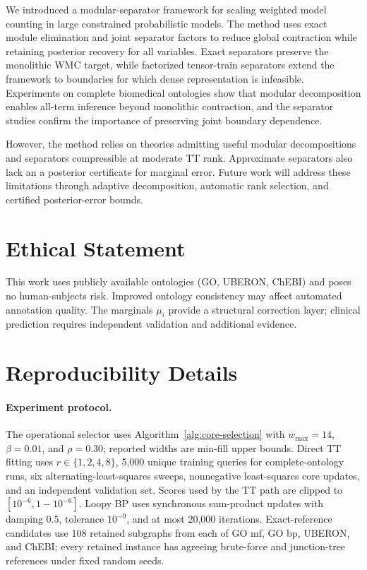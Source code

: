\documentclass[letterpaper]{article}
\newif\ifincludesupplement
\begin{document}
We introduced a modular-separator framework for scaling weighted
model counting in large constrained probabilistic models. The method
uses exact module elimination and joint separator factors to reduce
global contraction while retaining posterior recovery for all
variables. Exact separators preserve the monolithic WMC target, while
factorized tensor-train separators extend the framework to boundaries
for which dense representation is infeasible. Experiments on complete
biomedical ontologies show that modular decomposition enables
all-term inference beyond monolithic contraction, and the separator
studies confirm the importance of preserving joint boundary
dependence. 

However, the method relies on theories admitting useful modular
decompositions and separators compressible at moderate TT rank.
Approximate separators also lack an a posterior certificate for
marginal error. Future work will address these limitations through
adaptive decomposition, automatic rank selection, and certified
posterior-error bounds.

\ifincludesupplement
\section{Ethical Statement}
This work uses publicly available ontologies (GO, UBERON, ChEBI) and poses no human-subjects risk. Improved ontology consistency may affect automated annotation quality. The marginals $\mu_i$ provide a structural correction layer; clinical prediction requires independent validation and additional evidence.

\section{Reproducibility Details}
\label{app:reproducibility}

\paragraph{Experiment protocol.}
The operational selector uses Algorithm~\ref{alg:core-selection} with
\(w_{\max}=14\), \(\beta=0.01\), and \(\rho=0.30\); reported widths are
min-fill upper bounds. Direct TT fitting uses
\(r\in\{1,2,4,8\}\), 5,000 unique training queries for complete-ontology
runs, six alternating-least-squares sweeps, nonnegative least-squares core
updates, and an independent validation set. Scores used by the TT path are
clipped to \([10^{-6},1-10^{-6}]\). Loopy BP uses synchronous sum-product
updates with damping \(0.5\), tolerance \(10^{-9}\), and at most 20,000
iterations. Exact-reference candidates use 108 retained subgraphs from
each of GO mf, GO bp, UBERON, and ChEBI; every retained instance has
agreeing brute-force and junction-tree references under fixed random seeds.
\end{document}

